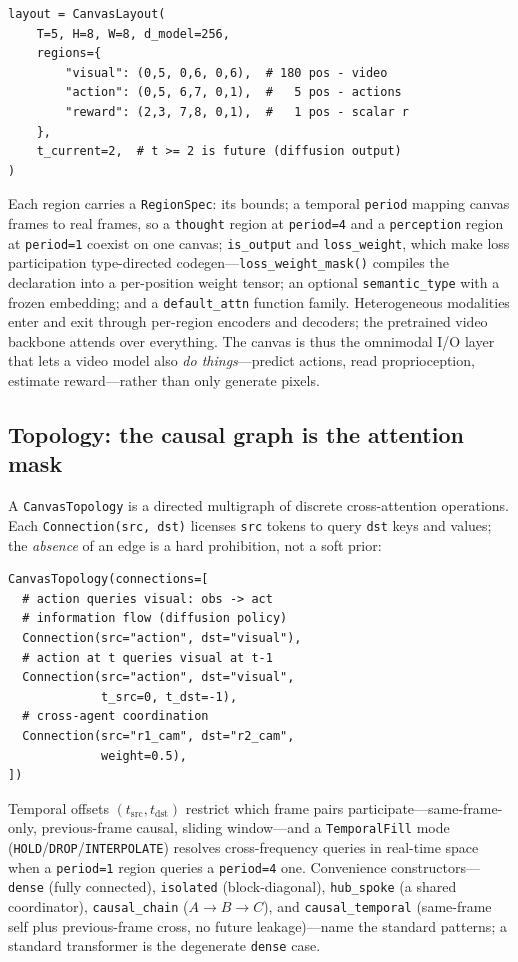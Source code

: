 \documentclass[10pt,twocolumn]{article}
\newcommand{\code}[1]{\texttt{\small #1}}
\begin{document}
\noindent\begin{minipage}{\linewidth}
\begin{lstlisting}
layout = CanvasLayout(
    T=5, H=8, W=8, d_model=256,
    regions={
        "visual": (0,5, 0,6, 0,6),  # 180 pos - video
        "action": (0,5, 6,7, 0,1),  #   5 pos - actions
        "reward": (2,3, 7,8, 0,1),  #   1 pos - scalar r
    },
    t_current=2,  # t >= 2 is future (diffusion output)
)
\end{lstlisting}
\end{minipage}

Each region carries a \code{RegionSpec}: its bounds; a temporal \code{period} mapping canvas frames to real frames, so a \code{thought} region at \code{period=4} and a \code{perception} region at \code{period=1} coexist on one canvas; \code{is\_output} and \code{loss\_weight}, which make loss participation type-directed codegen---\code{loss\_weight\_mask()} compiles the declaration into a per-position weight tensor; an optional \code{semantic\_type} with a frozen embedding; and a \code{default\_attn} function family. Heterogeneous modalities enter and exit through per-region encoders and decoders; the pretrained video backbone attends over everything. The canvas is thus the omnimodal I/O layer that lets a video model also \emph{do things}---predict actions, read proprioception, estimate reward---rather than only generate pixels.

\subsection{Topology: the causal graph is the attention mask}
A \code{CanvasTopology} is a directed multigraph of discrete cross-attention operations. Each \code{Connection(src, dst)} licenses \code{src} tokens to query \code{dst} keys and values; the \emph{absence} of an edge is a hard prohibition, not a soft prior:

\begin{lstlisting}
CanvasTopology(connections=[
  # action queries visual: obs -> act
  # information flow (diffusion policy)
  Connection(src="action", dst="visual"),
  # action at t queries visual at t-1
  Connection(src="action", dst="visual",
             t_src=0, t_dst=-1),
  # cross-agent coordination
  Connection(src="r1_cam", dst="r2_cam",
             weight=0.5),
])
\end{lstlisting}

Temporal offsets $(t_{\text{src}}, t_{\text{dst}})$ restrict which frame pairs participate---same-frame-only, previous-frame causal, sliding window---and a \code{TemporalFill} mode (\code{HOLD}/\code{DROP}/\code{INTERPOLATE}) resolves cross-frequency queries in real-time space when a \code{period=1} region queries a \code{period=4} one. Convenience constructors---\code{dense} (fully connected), \code{isolated} (block-diagonal), \code{hub\_spoke} (a shared coordinator), \code{causal\_chain} ($A\rightarrow B\rightarrow C$), and \code{causal\_temporal} (same-frame self plus previous-frame cross, no future leakage)---name the standard patterns; a standard transformer \cite{vaswani2017attention} is the degenerate \code{dense} case.
\end{document}
